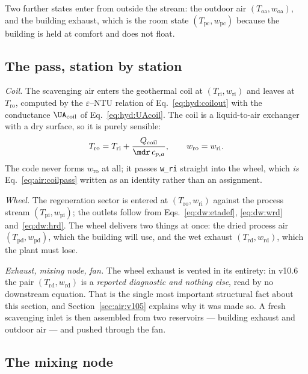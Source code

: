 \noindent
Two further states enter from outside the stream: the outdoor air
$(T_{\mathrm{oa}},w_{\mathrm{oa}})$, and the building exhaust, which is the
room state $(T_{\mathrm{pc}},w_{\mathrm{pc}})$ because the building is held at
comfort and does not float.

\subsection{The pass, station by station}
\label{sec:air:pass}

\emph{Coil.} The scavenging air enters the geothermal coil at
$(T_{\mathrm{ri}},w_{\mathrm{ri}})$ and leaves at $T_{\mathrm{ro}}$, computed
by the $\varepsilon$--NTU relation of Eq.~\eqref{eq:hyd:coilout} with the
conductance $\UA_{\mathrm{coil}}$ of Eq.~\eqref{eq:hyd:UAcoil}. The coil is a
liquid-to-air exchanger with a dry surface, so it is purely sensible:
\begin{equation}
T_{\mathrm{ro}} = T_{\mathrm{ri}} + \frac{Q_{\mathrm{coil}}}{\mdr\,c_{p,a}},
\qquad
w_{\mathrm{ro}} = w_{\mathrm{ri}} .
\label{eq:air:coilpass}
\end{equation}
The code never forms $w_{\mathrm{ro}}$ at all; it passes \texttt{w\_ri}
straight into the wheel, which \emph{is} Eq.~\eqref{eq:air:coilpass} written
as an identity rather than an assignment.

\emph{Wheel.} The regeneration sector is entered at
$(T_{\mathrm{ro}},w_{\mathrm{ri}})$ against the process stream
$(T_{\mathrm{pi}},w_{\mathrm{pi}})$; the outlets follow from
Eqs.~\eqref{eq:dw:etadef}, \eqref{eq:dw:wrd} and~\eqref{eq:dw:hrd}. The wheel
delivers two things at once: the dried process air
$(T_{\mathrm{pd}},w_{\mathrm{pd}})$, which the building will use, and the wet
exhaust $(T_{\mathrm{rd}},w_{\mathrm{rd}})$, which the plant must lose.

\emph{Exhaust, mixing node, fan.} The wheel exhaust is vented in its entirety:
in v10.6 the pair $(T_{\mathrm{rd}},w_{\mathrm{rd}})$ is a \emph{reported
diagnostic and nothing else}, read by no downstream equation. That is the
single most important structural fact about this section, and
Section~\ref{sec:air:v105} explains why it was made so. A fresh scavenging
inlet is then assembled from two reservoirs --- building exhaust and outdoor
air --- and pushed through the fan.

\subsection{The mixing node}
\label{sec:air:mix}

